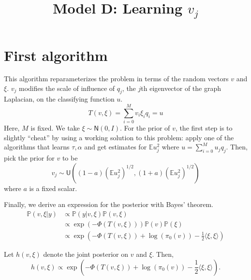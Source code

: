 \documentclass{siamart1116}
\title{Model D: Learning $v_j$}
\author{\TheAuthors}
\date{}
\begin{document}
\maketitle
\setlength{\unitlength}{1in}
\setlength{\parindent}{0in}
\section{First algorithm}
    This algorithm reparameterizes the problem in terms of the random vectors $v$ and $\xi$. $v_j$ modifies the scale of influence of $q_j$, the $j$th eigenvector of the graph Laplacian, on the classifying function $u$.
    \begin{equation}
    \label{eqn:v_T}
    T(v,\xi) = \sum_{i=0}^{M} v_i\xi_iq_i = u
    \end{equation}
    Here, $M$ is fixed. We take $\xi \sim \mathsf{N}(0, I)$. For the prior of $v$, the first step is to slightly ``cheat'' by using a working solution to this problem: apply one of the algorithms that learns $\tau, \alpha$ and get estimates for $\mathbb{E} u_j^2$ where $u = \sum_{i=0}^M u_j q_j$. Then, pick the prior for $v$ to be
    \[v_j \sim \mathsf{U}\left((1-a)(\mathbb{E}u_j^2)^{1/2},(1+a)(\mathbb{E}u_j^2)^{1/2}\right)\]
    where $a$ is a fixed scalar.

    Finally, we derive an expression for the posterior with Bayes' theorem.
    \begin{align*}
    \mathbb{P}(v,\xi | y) &\propto \mathbb{P}(y|v, \xi) \mathbb{P}(v, \xi)\\
    &\propto \exp \left(-\Phi(T(v,\xi)) \right) \mathbb{P}(v)\mathbb{P}(\xi) \\
    &\propto \exp \left(-\Phi(T(v,\xi)) + \log (\pi_0(v)) - \frac{1}{2}\langle \xi, \xi \rangle  \right)
    \end{align*}

    Let $h(v,\xi)$ denote the joint posterior on $v$ and $\xi$. Then,
    \begin{equation}
    \label{eqn:learn_v_posterior}
    h(v, \xi) \propto \exp \left(-\Phi(T(v,\xi)) + \log (\pi_0(v)) - \frac{1}{2}\langle \xi, \xi \rangle  \right).
    \end{equation}
\end{document}
